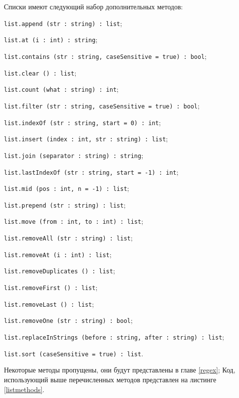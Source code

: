 Списки имеют следующий набор дополнительных методов:
\begin{icItems}
\item \texttt{list.append (str : string) : list};
\item \texttt{list.at (i : int) : string};
\item \texttt{list.contains (str : string, caseSensitive = true) : bool};
\item \texttt{list.clear () : list};
\item \texttt{list.count (what : string) : int};
\item \texttt{list.filter (str : string, caseSensitive = true) : bool};
\item \texttt{list.indexOf (str : string, start = 0) : int};
\item \texttt{list.insert (index : int, str : string) : list};
\item \texttt{list.join (separator : string) : string};
\item \texttt{list.lastIndexOf (str : string, start = -1) : int};
\item \texttt{list.mid (pos : int, n = -1) : list};
\item \texttt{list.prepend (str : string) : list};
\item \texttt{list.move (from : int, to : int) : list};
\item \texttt{list.removeAll (str : string) : list};
\item \texttt{list.removeAt (i : int) : list};
\item \texttt{list.removeDuplicates () : list};
\item \texttt{list.removeFirst () : list};
\item \texttt{list.removeLast () : list};
\item \texttt{list.removeOne (str : string) : bool};
\item \texttt{list.replaceInStrings (before : string, after : string) : list};
\item \texttt{list.sort (caseSensitive = true) : list}.
\end{icItems}

Некоторые методы пропущены, они будут представлены в главе \ref{regex}; Код, использующий выше перечисленных методов представлен на листинге \ref{listmethods}. 

